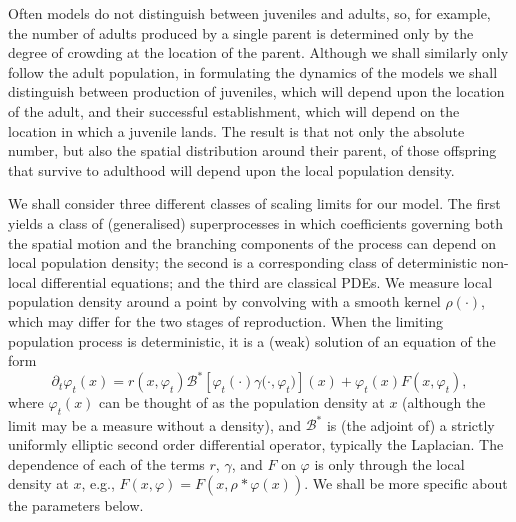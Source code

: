 \documentclass[EJP]{ejpecp} %
\newcommand{\DG}{\mathcal{B}}  %
\newcommand{\kernel}{\rho}  %
\newcommand{\smooth}[1]{\kernel_{#1} \! * \!}  %
\begin{document}
Often models do not distinguish between juveniles and adults, so,
for example, the number of adults produced by a single parent is determined only
by the degree of crowding at the location of the parent.
Although we shall similarly only follow the adult population, in formulating the dynamics of the
models we shall distinguish
between production of juveniles, which will depend upon the location of 
the adult, and their successful establishment, which will depend on the
location in which a juvenile lands. The result is that not only the absolute 
number, but also the spatial distribution
around their parent, 
of those offspring that survive to adulthood
will depend upon the local population 
density. 

We shall consider three different classes of scaling limits for our model.
The first yields a class of (generalised) superprocesses in which coefficients 
governing both the spatial motion and the branching components of the process can depend
on local population density; the second is a corresponding class of deterministic
non-local differential equations; and the third are classical PDEs.
We measure local population density around a point by convolving with
a smooth kernel $\rho(\cdot)$, which may differ
for the two stages of reproduction. 
When the limiting population process is deterministic,
it is a (weak) solution of an equation of the form
\begin{equation}
	\label{general deterministic limit}
        \partial_t \varphi_t(x)
        =
        r\left(x, \varphi_t \right)
        \DG^* \left[
            \varphi_t(\cdot)
            \gamma\big(\cdot, \varphi_t \big)
        \right](x)
        +
        \varphi_t(x)
        F\left(x, \varphi_t \right)
        ,
\end{equation}
where
$\varphi_t(x)$ can be thought of as the population density at $x$
(although the limit may be a measure without a density), and
$\DG^*$ is (the adjoint of) a strictly uniformly elliptic second order differential operator, typically the Laplacian.
The dependence of each of the terms $r$, $\gamma$, and $F$ on $\varphi$ is only through the local density at $x$,
e.g., $F(x, \varphi) = F(x, \smooth{} \varphi(x))$.
We shall be more specific about the parameters below. 
\end{document}
